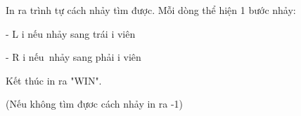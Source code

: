 In ra trình tự cách nhảy tìm được. Mỗi dòng thể hiện 1 bước nhảy:   


   - L i  nếu nhảy sang trái i viên   


   - R i  nếu nhảy sang phải i viên   


   Kết thúc in ra "WIN".   


   (Nếu không tìm đựơc cách nhảy in ra -1)